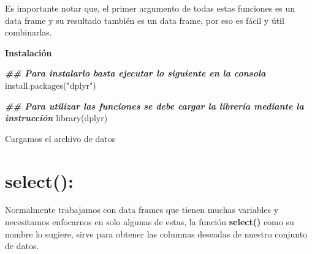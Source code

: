 \documentclass[
  12pt,
]{book}
\newenvironment{Shaded}{\begin{snugshade}}{\end{snugshade}}
\newcommand{\AttributeTok}[1]{\textcolor[rgb]{0.77,0.63,0.00}{#1}}
\newcommand{\DecValTok}[1]{\textcolor[rgb]{0.00,0.00,0.81}{#1}}
\newcommand{\DocumentationTok}[1]{\textcolor[rgb]{0.56,0.35,0.01}{\textbf{\textit{#1}}}}
\newcommand{\FunctionTok}[1]{\textcolor[rgb]{0.00,0.00,0.00}{#1}}
\newcommand{\NormalTok}[1]{#1}
\newcommand{\OtherTok}[1]{\textcolor[rgb]{0.56,0.35,0.01}{#1}}
\newcommand{\SpecialCharTok}[1]{\textcolor[rgb]{0.00,0.00,0.00}{#1}}
\newcommand{\StringTok}[1]{\textcolor[rgb]{0.31,0.60,0.02}{#1}}
\begin{document}
Es importante notar que, el primer argumento de todas estas funciones es un data frame y su resultado también es un data frame, por eso es fácil y útil combinarlas.

\textbf{Instalación}

\begin{Shaded}
\begin{Highlighting}[]
\DocumentationTok{\#\# Para instalarlo basta ejecutar lo siguiente en la consola}
\FunctionTok{install.packages}\NormalTok{(}\StringTok{"dplyr"}\NormalTok{)}

\DocumentationTok{\#\# Para utilizar las funciones se debe cargar la librería mediante la instrucción}
\FunctionTok{library}\NormalTok{(dplyr)}
\end{Highlighting}
\end{Shaded}

Cargamos el archivo de datos

\begin{Shaded}
\end{Shaded}

\hypertarget{select}{%
\section{\texorpdfstring{\textbf{select()}:}{select():}}\label{select}}

Normalmente trabajamos con data frames que tienen muchas variables y necesitamos enfocarnos en solo algunas de estas, la función \textbf{select()} como su nombre lo sugiere, sirve para obtener las columnas deseadas de nuestro conjunto de datos.
\end{document}
